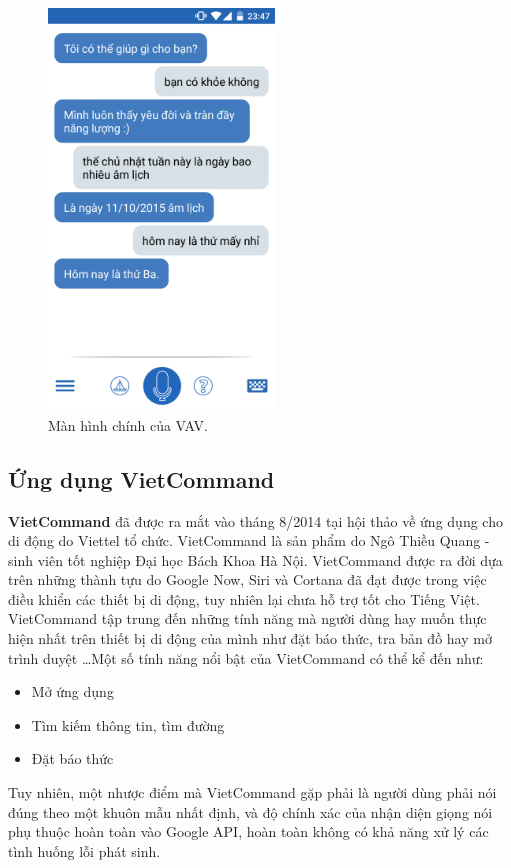 \documentclass[12pt]{report}
\begin{document}
\begin{figure}[H]
	\centering
	\includegraphics[width=6cm]{Pics/Chap5/vav.png}
	\caption{Màn hình chính của VAV.}
\end{figure}

\subsection{Ứng dụng VietCommand}

\textbf{VietCommand} đã được ra mắt vào tháng 8/2014 tại hội thảo về ứng dụng cho di động do Viettel tổ chức. VietCommand là sản phẩm do Ngô Thiều Quang - sinh viên tốt nghiệp Đại học Bách Khoa Hà Nội. VietCommand được ra đời dựa trên những thành tựu do Google Now, Siri và Cortana đã đạt được trong việc điều khiển các thiết bị di động, tuy nhiên lại chưa hỗ trợ tốt cho Tiếng Việt. VietCommand tập trung đến những tính năng mà người dùng hay muốn thực hiện nhất trên thiết bị di động của mình như đặt báo thức, tra bản đồ hay mở trình duyệt \ldots Một số tính năng nổi bật của VietCommand có thể kể đến như:

\begin{itemize}
	\item Mở ứng dụng
	\item Tìm kiếm thông tin, tìm đường
	\item Đặt báo thức
\end{itemize}

Tuy nhiên, một nhược điểm mà VietCommand gặp phải là người dùng phải nói đúng theo một khuôn mẫu nhất định, và độ chính xác của nhận diện giọng nói phụ thuộc hoàn toàn vào Google API, hoàn toàn không có khả năng xử lý các tình huống lỗi phát sinh.
\end{document}
